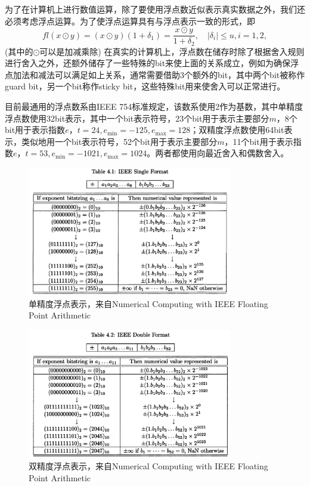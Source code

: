 \documentclass[a4paper,10pt]{ctexart}
\begin{document}
为了在计算机上进行数值运算，除了要使用浮点数近似表示真实数据之外，我们还必须考虑浮点运算。为了使浮点运算具有与浮点表示一致的形式，即
\begin{equation}
    fl(x\odot y) = (x\odot y)(1+\delta_1) = \frac{x\odot y}{1+\delta_2},\quad |\delta_i|\leqslant u, i=1,2,
\end{equation}
(其中的$ \odot $可以是加减乘除) 在真实的计算机上，浮点数在储存时除了根据舍入规则进行舍入之外，还额外储存了一些特殊的bit来使上面的关系成立，例如为确保浮点加法和减法可以满足如上关系，通常需要借助3个额外的bit，其中两个bit被称作guard bit，另一个bit称作sticky bit，这些特殊bit用来使舍入可以正常进行。

目前最通用的浮点数系由IEEE 754标准规定，该数系使用2作为基数，其中单精度浮点数使用32bit表示，其中一个bit表示符号，23个bit用于表示主要部分$ m $，8个bit用于表示指数$ e $，$ t=24,e_{\min}=-125,e_{\max}=128 $；双精度浮点数使用64bit表示，类似地用一个bit表示符号，52个bit用于表示主要部分$ m $，11个bit用于表示指数$ e $，$ t=53,e_{\min}=-1021,e_{\max}=1024 $。两者都使用向最近舍入和偶数舍入。

\begin{figure}[htpb]
    \centering
    \includegraphics[width=0.8\textwidth]{IEEE Single Format.png}
    \caption{单精度浮点表示，来自Numerical Computing with IEEE Floating Point Arithmetic}
    \label{fig:SingleFormat}
\end{figure}

\begin{figure}[htpb]
    \centering
    \includegraphics[width=0.8\textwidth]{IEEE Double Format.png}
    \caption{双精度浮点表示，来自Numerical Computing with IEEE Floating Point Arithmetic}
    \label{fig:DoubleFormat}
\end{figure}
\end{document}
